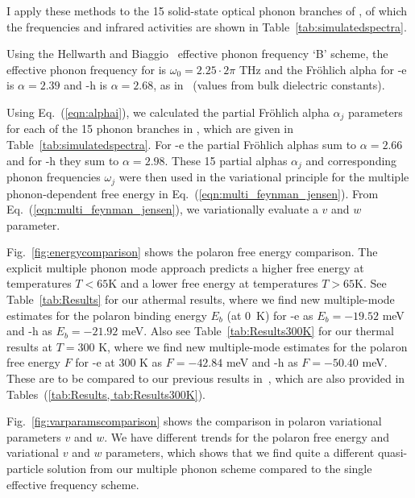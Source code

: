 I apply these methods to the 15 solid-state optical phonon branches of , of which the frequencies and infrared activities are shown in Table~\ref{tab:simulatedspectra}.

Using the Hellwarth and Biaggio~\cite{hellwarth_mobility_1999} effective phonon frequency `B' scheme, the effective phonon frequency for  is $\omega_0 = 2.25 \cdot 2\pi$ THz and the Fr\"ohlich alpha for -e is $\alpha = 2.39$ and -h is $\alpha = 2.68$, as in~\cite{frost_calculating_2017} (values from bulk dielectric constants).

Using Eq.~(\ref{eqn:alphai}), we calculated the partial Fr\"ohlich alpha $\alpha_j$ parameters for each of the 15 phonon branches in , which are given in Table~\ref{tab:simulatedspectra}. For -e the partial Fr\"ohlich alphas sum to $\alpha = 2.66$ and for -h they sum to $\alpha = 2.98$. These 15 partial alphas $\alpha_j$ and corresponding phonon frequencies $\omega_j$ were then used in the variational principle for the multiple phonon-dependent free energy in Eq.~(\ref{eqn:multi_feynman_jensen}). From Eq.~(\ref{eqn:multi_feynman_jensen}), we variationally evaluate a $v$ and $w$ parameter.

Fig.~\ref{fig:energycomparison} shows the polaron free energy comparison. The explicit multiple phonon mode approach predicts a higher free energy at temperatures $T < 65$K and a lower free energy at temperatures $T > 65$K. See Table~\ref{tab:Results} for our athermal results, where we find new multiple-mode estimates for the polaron binding energy $E_b$ (at \SI{0}{\kelvin}) for -e as $E_b = -19.52$ meV and -h as $E_b = -21.92$ meV. Also see Table~\ref{tab:Results300K} for our thermal results at $T = 300$ K, where we find new multiple-mode estimates for the polaron free energy $F$ for -e at $300$ K as $F = -42.84$ meV and -h as $F = -50.40$ meV. These are to be compared to our previous results in~\cite{frost_calculating_2017}, which are also provided in Tables~(\ref{tab:Results, tab:Results300K}).

Fig.~\ref{fig:varparamscomparison} shows the comparison in polaron variational parameters $v$ and $w$. We have different trends for the polaron free energy and variational $v$ and $w$ parameters, which shows that we find quite a different quasi-particle solution from our multiple phonon scheme compared to the single effective frequency scheme. 

